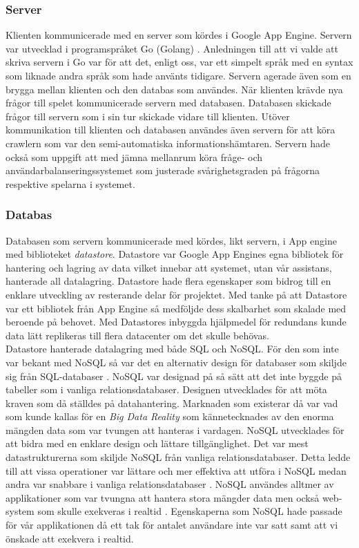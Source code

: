 \documentclass[a4paper, 11pt]{article}
\begin{document}
\subsubsection{Server}
Klienten kommunicerade med en server som kördes i Google App Engine. Servern var utvecklad i programspråket Go (Golang) \cite{golang}. Anledningen till att vi valde att skriva servern i Go var för att det, enligt oss, var ett simpelt språk med en syntax som liknade andra språk som hade använts tidigare. Servern agerade även som en brygga mellan klienten och den databas som användes. När klienten krävde nya frågor till spelet kommunicerade servern med databasen. Databasen skickade frågor till servern som i sin tur skickade vidare till klienten. Utöver kommunikation till klienten och databasen användes även servern för att köra crawlern som var den semi-automatiska informationshämtaren. Servern hade också som uppgift att med jämna mellanrum köra fråge- och användarbalanseringssystemet som justerade svårighetsgraden på frågorna respektive spelarna i systemet. 

\subsubsection{Databas}
Databasen som servern kommunicerade med kördes, likt servern, i App engine med biblioteket \textit{datastore}. Datastore \cite{datastore} var Google App Engines egna bibliotek för hantering och lagring av data vilket innebar att systemet, utan vår assistans, hanterade all datalagring. Datastore hade flera egenskaper som bidrog till en enklare utveckling av resterande delar för projektet. Med tanke på att Datastore var ett bibliotek från App Engine så medföljde dess skalbarhet som skalade med beroende på behovet. Med Datastores inbyggda hjälpmedel för redundans kunde data lätt replikeras till flera datacenter om det skulle behövas. \\
Datastore hanterade datalagring med både SQL och NoSQL. För den som inte var bekant med NoSQL så var det en alternativ design för databaser som skiljde sig från SQL-databaser \cite{nosql}. NoSQL var designad på så sätt att det inte byggde på tabeller som i vanliga relationsdatabaser. Designen utvecklades för att möta kraven som då ställdes på datahantering. Marknaden som existerar då var vad som kunde kallas för en \textit{Big Data Reality} som kännetecknades av den enorma mängden data som var tvungen att hanteras i vardagen. NoSQL utvecklades för att bidra med en enklare design och lättare tillgänglighet. Det var mest datastrukturerna som skiljde NoSQL från vanliga relationsdatabaser. Detta ledde till att vissa operationer var lättare och mer effektiva att utföra i NoSQL medan andra var snabbare i vanliga relationsdatabaser \cite{nosqlfacts}. NoSQL användes alltmer av applikationer som var tvungna att hantera stora mängder data men också web-system som skulle exekveras i realtid \cite{nosqlcloud}. Egenskaperna som NoSQL hade passade för vår applikationen då ett tak för antalet användare inte var satt samt att vi önskade att exekvera i realtid.
\end{document}
